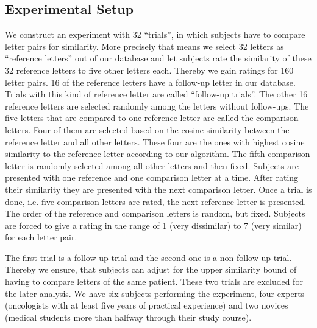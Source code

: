\subsection*{Experimental Setup}
We construct an experiment with 32 ``trials'', in which subjects have to compare letter pairs for similarity. More precisely that means we select 32 letters as ``reference letters'' out of our database and let subjects rate the similarity of these 32 reference letters to five other letters each. Thereby we gain ratings for 160 letter pairs. 16 of the reference letters have a follow-up letter in our database. Trials with this kind of reference letter are called ``follow-up trials''. The other 16 reference letters are selected randomly among the letters without follow-ups. The five letters that are compared to one reference letter are called the comparison letters. Four of them are selected based on the cosine similarity between the reference letter and all other letters. These four are the ones with highest cosine similarity to the reference letter according to our algorithm. The fifth comparison letter is randomly selected among all other letters and then fixed. Subjects are presented with one reference and one comparison letter at a time. After rating their similarity they are presented with the next comparison letter. Once a trial is done, i.e. five comparison letters are rated, the next reference letter is presented. The order of the reference and comparison letters is random, but fixed. Subjects are forced to give a rating in the range of 1 (very dissimilar) to 7 (very similar) for each letter pair.%

The first trial is a follow-up trial and the second one is a non-follow-up trial. Thereby we ensure, that subjects can adjust for the upper similarity bound of having to compare letters of the same patient. These two trials are excluded for the later analysis. We have six subjects performing the experiment, four experts (oncologists with at least five years of practical experience) and two novices (medical students more than halfway through their study course).





